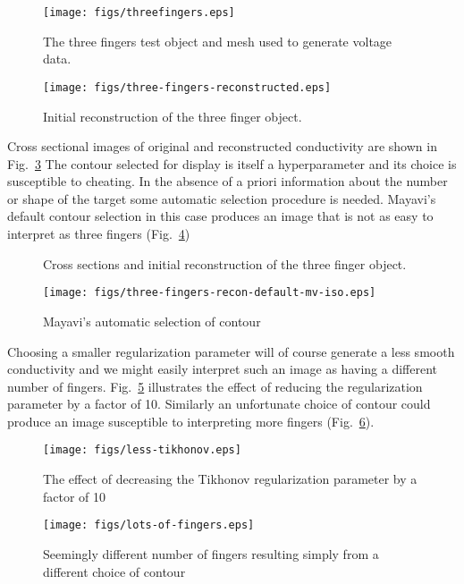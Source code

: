 \documentclass[12pt]{iopart}
\begin{document}
%
%
\begin{figure}[th]
\texttt{[image: figs/threefingers.eps]}
\caption{\label{fig:threefingers}The three fingers test object and mesh used to generate voltage data.}
\end{figure}



%
%
\begin{figure}[th]
\texttt{[image: figs/three-fingers-reconstructed.eps]}
\caption{\label{fig:3fingers1}
Initial reconstruction of the three finger object.}
\end{figure}

Cross sectional images of original and reconstructed
conductivity are shown in Fig.~\ref{fig:3fingersXsect}
The contour selected for display is itself a
hyperparameter and its choice is susceptible to
cheating. In the absence of a priori information about
the number or shape of the target some automatic selection
procedure is needed. Mayavi's default contour selection
in this case produces an image that is not as easy to
interpret as three fingers (Fig.~\ref{fig:3fingersMVdefault})

%
%
\begin{figure}[th]

\caption{\label{fig:3fingersXsect}
Cross sections and initial reconstruction of the three finger object.}
\end{figure}

%
%
\begin{figure}[th]
\texttt{[image: figs/three-fingers-recon-default-mv-iso.eps]}
\caption{\label{fig:3fingersMVdefault}
Mayavi's automatic selection of contour}
\end{figure}
Choosing a smaller regularization parameter will of
course generate a less smooth conductivity and we might
easily interpret such an image as having a different number
of fingers.
Fig.~\ref{fig:3fingersLessTik} illustrates the effect of
reducing the regularization parameter by a factor of
10. Similarly an unfortunate choice of contour could
produce an image susceptible to interpreting more fingers
(Fig.~\ref{fig:3fingersMoreFingers}).
\begin{figure}[th]
\texttt{[image: figs/less-tikhonov.eps]}
\caption{\label{fig:3fingersLessTik}
The effect of decreasing the Tikhonov regularization parameter
 by a factor of 10}
\end{figure}
\begin{figure}[th]
\texttt{[image: figs/lots-of-fingers.eps]}
\caption{\label{fig:3fingersMoreFingers}
Seemingly different number of fingers resulting simply from a
 different choice of contour}
\end{figure}
\end{document}

